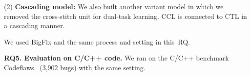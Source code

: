 
(2) \textbf{Cascading model:} We also built another variant model in
which we removed the cross-stitch unit for dual-task learning. CCL is
connected to CTL in a cascading manner.



We used BigFix and the same process and setting in this~RQ.



{\bf RQ5. Evaluation on C/C++ code.} We ran {\tool} on the C/C++ benchmark
Codeflaws~\cite{tan2017codeflaws} (3,902 bugs) with the same
setting.
